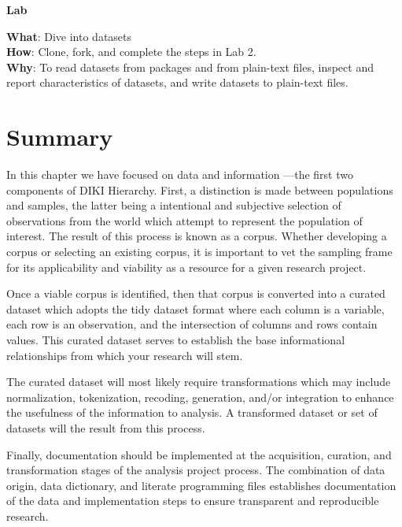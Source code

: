 \documentclass[
  letterpaper,
  krantz1]{latex/krantz-mod}
\theoremstyle{definition}
\theoremstyle{definition}
\theoremstyle{remark}
\begin{document}
\begin{tcolorbox}[enhanced jigsaw, toprule=.15mm, breakable, colback=white, arc=.35mm, left=2mm, colframe=quarto-callout-color-frame, opacityback=0, bottomrule=.15mm, rightrule=.15mm, leftrule=.75mm]

\textbf{ Lab}

\textbf{What}: Dive into datasets\\
\textbf{How}: Clone, fork, and complete the steps in Lab 2.\\
\textbf{Why}: To read datasets from packages and from plain-text files,
inspect and report characteristics of datasets, and write datasets to
plain-text files.

\end{tcolorbox}

\section*{Summary}\label{summary-1}


In this chapter we have focused on data and information ---the first two
components of DIKI Hierarchy. First, a distinction is made between
populations and samples, the latter being a intentional and subjective
selection of observations from the world which attempt to represent the
population of interest. The result of this process is known as a corpus.
Whether developing a corpus or selecting an existing corpus, it is
important to vet the sampling frame for its applicability and viability
as a resource for a given research project.

Once a viable corpus is identified, then that corpus is converted into a
curated dataset which adopts the tidy dataset format where each column
is a variable, each row is an observation, and the intersection of
columns and rows contain values. This curated dataset serves to
establish the base informational relationships from which your research
will stem.

The curated dataset will most likely require transformations which may
include normalization, tokenization, recoding, generation, and/or
integration to enhance the usefulness of the information to analysis. A
transformed dataset or set of datasets will the result from this
process.

Finally, documentation should be implemented at the acquisition,
curation, and transformation stages of the analysis project process. The
combination of data origin, data dictionary, and literate programming
files establishes documentation of the data and implementation steps to
ensure transparent and reproducible research.
\end{document}
